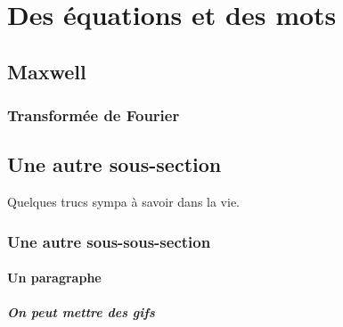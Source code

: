 \section{Des équations et des mots}

\subsection{Maxwell}


\subsubsection{Transformée de Fourier}

\subsection{Une autre sous-section}
Quelques trucs sympa à savoir dans la vie.
\subsubsection{Une autre sous-sous-section}
\paragraph{Un paragraphe}
\subparagraph{On peut mettre des gifs \?}